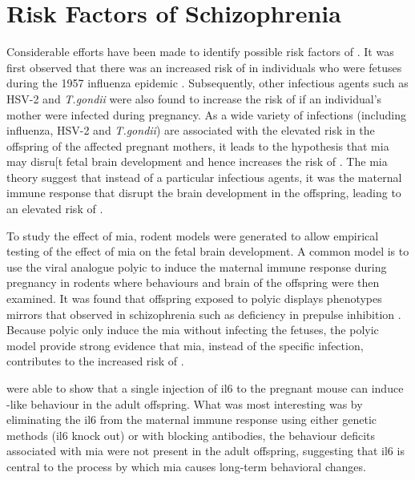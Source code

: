 	\section{Risk Factors of Schizophrenia}
	Considerable efforts have been made to identify possible risk factors of . 
	It was first observed that there was an increased risk of  in individuals who were fetuses during the 1957 influenza epidemic \citep{Mednick1958}. 
	Subsequently, other infectious agents such as HSV-2 and \textit{T.gondii} were also found to increase the risk of  if an individual's mother were infected during pregnancy.
	As a wide variety of infections (including influenza, HSV-2 and \textit{T.gondii}) are associated with the elevated  risk in the offspring of the affected pregnant mothers, it leads to the hypothesis that \gls{mia} may disru[t fetal brain development and hence increases the risk of  \citep{Brown2010}.
	The \gls{mia} theory suggest that instead of a particular infectious agents, it was the maternal immune response that disrupt the brain development in the offspring, leading to an elevated risk of .

	To study the effect of \gls{mia}, rodent models were generated to allow empirical testing of the effect of \gls{mia} on the fetal brain development. 
	A common model is to use the viral analogue \gls{polyic} to induce the maternal immune response during pregnancy in rodents where behaviours and brain of the offspring were then examined.
	It was found that offspring exposed to \gls{polyic} displays phenotypes mirrors that observed in schizophrenia \citep{Li2009c,Meyer2009b,Li2010a} such as deficiency in prepulse inhibition \citep{Cadenhead2000}.
	Because \gls{polyic} only induce the \gls{mia} without infecting the fetuses, the \gls{polyic} model provide strong evidence that \gls{mia}, instead of the specific infection, contributes to the increased risk of .
	
	\citet{Smith2007} were able to show that a single injection of \gls{il6} to the pregnant mouse can induce -like behaviour in the adult offspring. 
	What was most interesting was by eliminating the \gls{il6} from the maternal immune response using either genetic methods (\gls{il6} knock out) or with blocking antibodies, the behaviour deficits associated with \gls{mia} were not present in the adult offspring, suggesting that \gls{il6} is central to the process by which \gls{mia} causes long-term behavioral changes.
	
